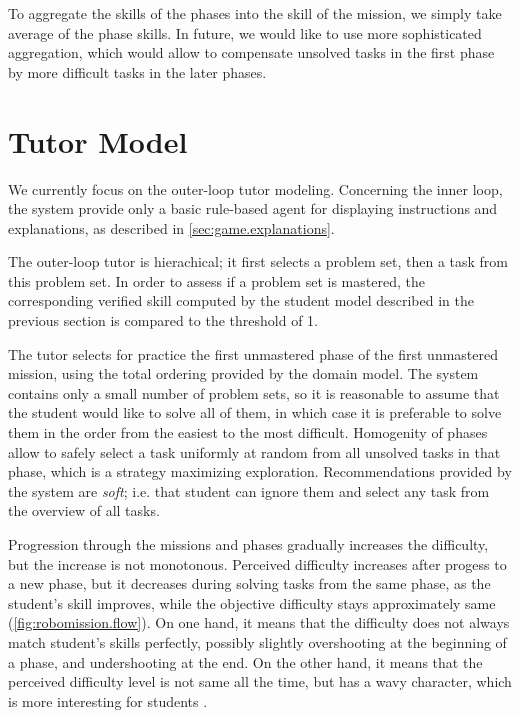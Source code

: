 To aggregate the skills of the phases into the skill of the mission,
we simply take average of the phase skills.
In future, we would like to use more sophisticated aggregation,
which would allow to compensate unsolved tasks in the first phase
by more difficult tasks in the later phases.

\section{Tutor Model}
\label{robomission.tutor}

We currently focus on the outer-loop tutor modeling.
Concerning the inner loop, the system provide only a basic
rule-based agent for displaying instructions and explanations,
as described in \cref{sec:game.explanations}.

The outer-loop tutor is hierachical;
it first selects a problem set, then a task from this problem set.
In order to assess if a problem set is mastered,
the corresponding verified skill
computed by the student model described in the previous section
is compared to the threshold of 1. %

The tutor selects for practice the first unmastered phase of the first
unmastered mission, using the total ordering provided by the domain model.
The system contains only a small number of problem sets,
so it is reasonable to assume that the student would like to solve all of
them,
in which case it is preferable to solve them in the order from the
easiest to the most difficult.
Homogenity of phases allow to safely select a task uniformly at random from
all unsolved tasks in that phase, which is a strategy maximizing exploration.
Recommendations provided by the system are \emph{soft};
i.e. that student can ignore them and select any task
from the overview of all tasks.

Progression through the missions and phases gradually increases the difficulty,
but the increase is not monotonous.
Perceived difficulty increases after progess to a new phase,
but it decreases during solving tasks from the same phase,
as the student's skill improves, while the objective difficulty stays
approximately same (\cref{fig:robomission.flow}).
On one hand, it means that the difficulty does not always match student's
skills perfectly, possibly slightly overshooting at the beginning of a phase,
and undershooting at the end.
On the other hand, it means that the perceived difficulty level is not
same all the time, but has a wavy character, which is more interesting
for students %
\cite{book-of-lenses}.

